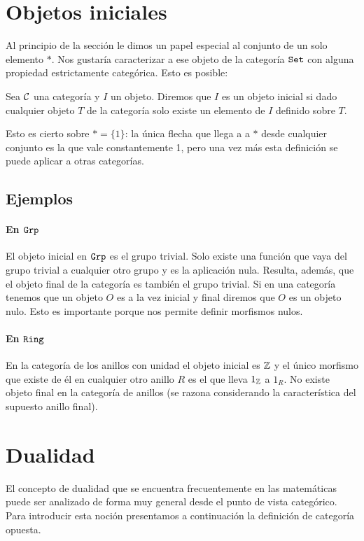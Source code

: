\section{Objetos iniciales}
Al principio de la sección le dimos un papel especial al conjunto
de un solo elemento $*$. Nos gustaría caracterizar a ese objeto de
la categoría $\texttt{Set}$ con alguna propiedad estrictamente categórica.
Esto es posible:

\begin{definition}
Sea $\mathcal{C}$ una categoría y $I$ un objeto. Diremos que $I$ es un objeto
inicial si dado cualquier objeto $T$ de la categoría solo existe un
elemento de $I$ definido sobre $T$.
\end{definition}

Esto es cierto sobre $* = \{ 1 \}$: la única flecha que llega a
a $*$ desde cualquier conjunto es la que vale constantemente 1, pero
una vez más esta definición se puede aplicar a otras categorías.

\subsection{Ejemplos}
\paragraph{En $\texttt{Grp}$}
El objeto inicial en $\texttt{Grp}$ es el grupo trivial. Solo existe una función
que vaya del grupo trivial a cualquier otro grupo y es la aplicación
nula. Resulta, además, que el objeto final de la categoría es también
el grupo trivial. Si en una categoría tenemos que un objeto
$O$ es a la vez inicial y final diremos que $O$ es un objeto nulo. Esto
es importante porque nos permite definir morfismos nulos.

\paragraph{En $\texttt{Ring}$}
En la categoría de los anillos con unidad el objeto inicial es
$\mathbb{Z}$ y el único morfismo que existe de él en cualquier otro anillo
$R$ es el que lleva $1_{\mathbb{Z}}$ a $1_R$. No existe objeto final en la
categoría de anillos (se razona considerando la característica
del supuesto anillo final).

\section{Dualidad}
El concepto de dualidad que se encuentra frecuentemente en las
matemáticas puede ser analizado de forma muy general desde el punto
de vista categórico. Para introducir esta noción presentamos a
continuación la definición de categoría opuesta.


